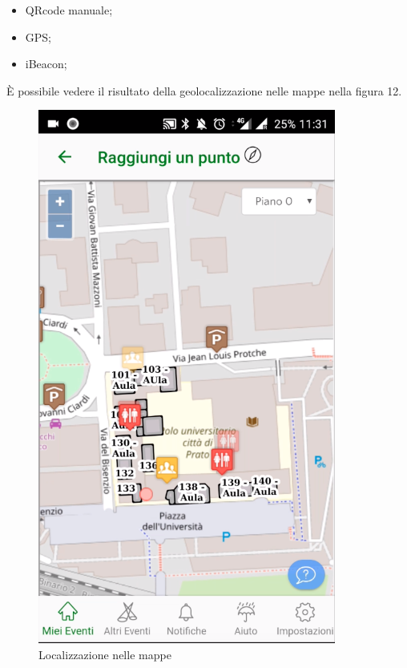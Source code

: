 \begin{itemize}
    \item QRcode manuale;
    \item GPS;
    \item iBeacon;
\end{itemize}


È possibile vedere il risultato della geolocalizzazione nelle mappe
nella figura 12.
\begin{figure}[H]
    \caption{Localizzazione nelle mappe}
    \centering  
    \includegraphics[scale=0.5]{img/cap2/geo-1}
\end{figure}


